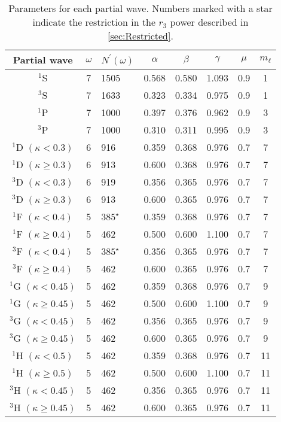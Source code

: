 \documentclass[Dissertation.tex]{subfiles}
\begin{document}
\begin{table}
  \centering
  \begin{tabular}{cclccccc}
	\toprule
	Partial wave & $\omega$ & $N^\prime(\omega)$ & $\alpha$ & $\beta$ & $\gamma$ & $\mu$ & $m_\ell$ \\
	\midrule
	$^1$S                      & 7 & 1505        & 0.568 & 0.580 & 1.093 & 0.9 & 1 \\
	$^3$S                      & 7 & 1633        & 0.323 & 0.334 & 0.975 & 0.9 & 1 \\
	$^1$P                      & 7 & 1000        & 0.397 & 0.376 & 0.962 & 0.9 & 3 \\
	$^3$P                      & 7 & 1000        & 0.310 & 0.311 & 0.995 & 0.9 & 3 \\
	$^1$D $(\kappa < 0.3)$     & 6 & 916         & 0.359 & 0.368 & 0.976 & 0.7 & 7 \\
	$^1$D $(\kappa \geq 0.3)$  & 6 & 913         & 0.600 & 0.368 & 0.976 & 0.7 & 7 \\
	$^3$D $(\kappa < 0.3)$     & 6 & 919         & 0.356 & 0.365 & 0.976 & 0.7 & 7 \\
	$^3$D $(\kappa \geq 0.3)$  & 6 & 913         & 0.600 & 0.365 & 0.976 & 0.7 & 7 \\
	$^1$F $(\kappa < 0.4)$     & 5 & $385^\star$ & 0.359 & 0.368 & 0.976 & 0.7 & 7 \\
	$^1$F $(\kappa \geq 0.4)$  & 5 & 462         & 0.500 & 0.600 & 1.100 & 0.7 & 7 \\
	$^3$F $(\kappa < 0.4)$     & 5 & $385^\star$ & 0.356 & 0.365 & 0.976 & 0.7 & 7 \\
    $^3$F $(\kappa \geq 0.4)$  & 5 & 462         & 0.600 & 0.365 & 0.976 & 0.7 & 7 \\
	$^1$G $(\kappa < 0.45)$    & 5 & 462         & 0.359 & 0.368 & 0.976 & 0.7 & 9 \\
    $^1$G $(\kappa \geq 0.45)$ & 5 & 462         & 0.500 & 0.600 & 1.100 & 0.7 & 9 \\
	$^3$G $(\kappa < 0.45)$    & 5 & 462         & 0.356 & 0.365 & 0.976 & 0.7 & 9 \\
    $^3$G $(\kappa \geq 0.45)$ & 5 & 462         & 0.600 & 0.365 & 0.976 & 0.7 & 9 \\
	$^1$H $(\kappa < 0.5)$     & 5 & 462         & 0.359 & 0.368 & 0.976 & 0.7 & 11 \\
	$^1$H $(\kappa \geq 0.5)$  & 5 & 462         & 0.500 & 0.600 & 1.100 & 0.7 & 11 \\
	$^3$H $(\kappa < 0.45)$    & 5 & 462         & 0.356 & 0.365 & 0.976 & 0.7 & 11 \\
    $^3$H $(\kappa \geq 0.45)$ & 5 & 462         & 0.600 & 0.365 & 0.976 & 0.7 & 11 \\
	\bottomrule
  \end{tabular}
  \caption[Parameters for each partial wave]{Parameters for each partial wave. Numbers marked with a star indicate the
restriction in the $r_3$ power described in \cref{sec:Restricted}.}
  \label{tab:Nonlinear}
\end{table}
\end{document}
